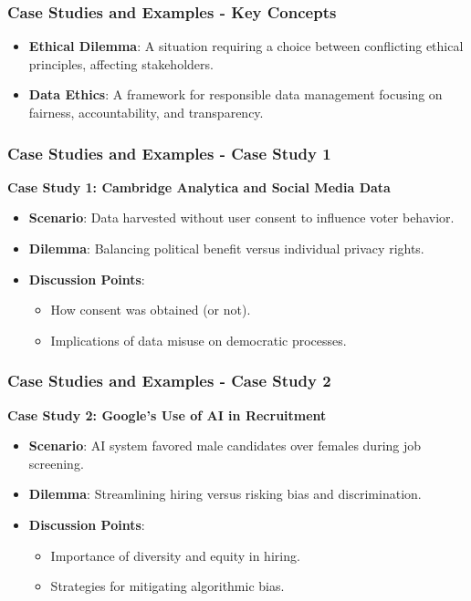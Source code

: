 \documentclass[aspectratio=169]{beamer}
\begin{document}
\begin{frame}[fragile]
    \frametitle{Case Studies and Examples - Key Concepts}
    \begin{itemize}
        \item \textbf{Ethical Dilemma}: A situation requiring a choice between conflicting ethical principles, affecting stakeholders.
        \item \textbf{Data Ethics}: A framework for responsible data management focusing on fairness, accountability, and transparency.
    \end{itemize}
\end{frame}

\begin{frame}[fragile]
    \frametitle{Case Studies and Examples - Case Study 1}
    \textbf{Case Study 1: Cambridge Analytica and Social Media Data}
    \begin{itemize}
        \item \textbf{Scenario}: Data harvested without user consent to influence voter behavior.
        \item \textbf{Dilemma}: Balancing political benefit versus individual privacy rights.
        \item \textbf{Discussion Points}:
        \begin{itemize}
            \item How consent was obtained (or not).
            \item Implications of data misuse on democratic processes.
        \end{itemize}
    \end{itemize}
\end{frame}

\begin{frame}[fragile]
    \frametitle{Case Studies and Examples - Case Study 2}
    \textbf{Case Study 2: Google's Use of AI in Recruitment}
    \begin{itemize}
        \item \textbf{Scenario}: AI system favored male candidates over females during job screening.
        \item \textbf{Dilemma}: Streamlining hiring versus risking bias and discrimination.
        \item \textbf{Discussion Points}:
        \begin{itemize}
            \item Importance of diversity and equity in hiring.
            \item Strategies for mitigating algorithmic bias.
        \end{itemize}
    \end{itemize}
\end{frame}
\end{document}
